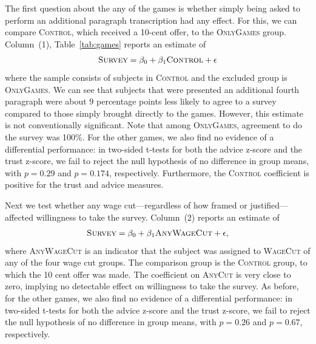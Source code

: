 \documentclass[11pt]{article}
\begin{document}
The first question about the any of the games is whether simply being asked to perform an additional paragraph transcription had any effect.
For this, we can compare \textsc{Control}, which received a 10-cent offer, to the \textsc{OnlyGames} group.
Column~(1), Table~\ref{tab:games} reports an estimate of 
\begin{align}
  \textsc{Survey} = \beta_0 + \beta_{1} \textsc{Control} + \epsilon 
\end{align} 
where the sample consists of subjects in \textsc{Control} and the excluded group is \textsc{OnlyGames}.
We can see that subjects that were presented an additional fourth paragraph were about 9 percentage points less likely to agree to a survey compared to those simply brought directly to the games.
However, this estimate is not conventionally significant. 
Note that among \textsc{OnlyGames}, agreement to do the survey was 100\%. 
For the other games, we also find no evidence of a differential performance:
in two-sided t-tests for both the advice z-score and the trust z-score, we fail to reject the null hypothesis of no difference in group means, with $p = 0.29$ and $p = 0.174$, respectively.
Furthermore, the \textsc{Control} coefficient is positive for the trust and advice measures. 

Next we test whether any wage cut---regardless of how framed or justified---affected willingness to take the survey. 
Column~(2) reports an estimate of 
\begin{align}
  \textsc{Survey} = \beta_0 + \beta_1 \textsc{AnyWageCut} + \epsilon,  
\end{align} 
where \textsc{AnyWageCut} is an indicator that the subject was assigned to \textsc{WageCut} of any of the four wage cut groups. 
The comparison group is the \textsc{Control} group, to which the 10 cent offer was made. 
The coefficient on \textsc{AnyCut} is very close to zero, implying no detectable effect on willingness to take the survey.
As before, for the other games, we also find no evidence of a differential performance:
in two-sided t-tests for both the advice z-score and the trust z-score, we fail to reject the null hypothesis of no difference in group means, with $p = 0.26$ and $p = 0.67$, respectively.


\end{document}
